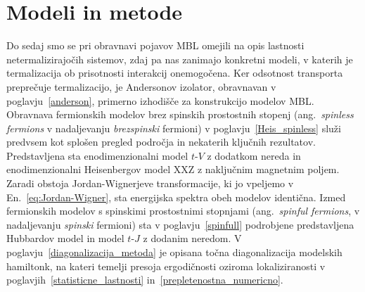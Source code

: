 \chapter{Modeli in metode}\label{modelimetode}
Do sedaj smo se pri obravnavi pojavov MBL omejili na opis lastnosti netermalizirajočih sistemov, zdaj pa nas zanimajo konkretni modeli, v katerih je termalizacija ob prisotnosti interakcij onemogočena. Ker odsotnost transporta preprečuje termalizacijo, je Andersonov izolator, obravnavan v poglavju~\ref{anderson}, primerno izhodišče za konstrukcijo modelov MBL. Obravnava fermionskih modelov brez spinskih prostostnih stopenj (ang.~\emph{spinless fermions} v nadaljevanju \emph{brezspinski} fermioni) v poglavju~\ref{Heis_spinless} služi predvsem kot splošen pregled področja in nekaterih ključnih rezultatov. Predstavljena sta enodimenzionalni model $t$-$V$ z dodatkom nereda in enodimenzionalni Heisenbergov model XXZ z naključnim magnetnim poljem. Zaradi obstoja Jordan-Wignerjeve transformacije, ki jo vpeljemo v En.~\eqref{eq:Jordan-Wigner}, sta energijska spektra obeh modelov identična. 
Izmed fermionskih modelov s spinskimi prostostnimi stopnjami (ang.~\emph{spinful fermions}, v nadaljevanju \emph{spinski} fermioni) sta v poglavju~\ref{spinfull} podrobjene predstavljena Hubbardov model in model $t$-$J$ z dodanim neredom. 
V poglavju~\ref{diagonalizacija_metoda} je opisana točna diagonalizacija modelskih hamiltonk, na kateri temelji presoja ergodičnosti oziroma lokaliziranosti v poglavjih~\ref{statisticne_lastnosti} in~\ref{prepletenostna_numericno}.

